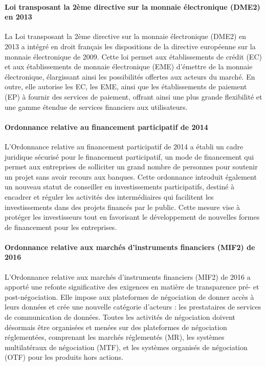 \documentclass[a4paper, 12pt]{report}
\begin{document}
\paragraph{Loi transposant la 2ème directive sur la monnaie électronique (DME2) en 2013}

La Loi transposant la 2ème directive sur la monnaie électronique (DME2) en 2013 a intégré en droit français les dispositions de la directive européenne sur la monnaie électronique de 2009. Cette loi permet aux établissements de crédit (EC) et aux établissements de monnaie électronique (EME) d’émettre de la monnaie électronique, élargissant ainsi les possibilités offertes aux acteurs du marché. En outre, elle autorise les EC, les EME, ainsi que les établissements de paiement (EP) à fournir des services de paiement, offrant ainsi une plus grande flexibilité et une gamme étendue de services financiers aux utilisateurs.

\paragraph{Ordonnance relative au financement participatif de 2014}

L'Ordonnance relative au financement participatif de 2014 a établi un cadre juridique sécurisé pour le financement participatif, un mode de financement qui permet aux entreprises de solliciter un grand nombre de personnes pour soutenir un projet sans avoir recours aux banques. Cette ordonnance introduit également un nouveau statut de conseiller en investissements participatifs, destiné à encadrer et réguler les activités des intermédiaires qui facilitent les investissements dans des projets financés par le public. Cette mesure vise à protéger les investisseurs tout en favorisant le développement de nouvelles formes de financement pour les entreprises.

\paragraph{Ordonnance relative aux marchés d’instruments financiers (MIF2) de 2016}

L'Ordonnance relative aux marchés d’instruments financiers (MIF2) de 2016 a apporté une refonte significative des exigences en matière de transparence pré- et post-négociation. Elle impose aux plateformes de négociation de donner accès à leurs données et crée une nouvelle catégorie d'acteurs : les prestataires de services de communication de données. Toutes les activités de négociation doivent désormais être organisées et menées sur des plateformes de négociation réglementées, comprenant les marchés réglementés (MR), les systèmes multilatéraux de négociation (MTF), et les systèmes organisés de négociation (OTF) pour les produits hors actions.
\end{document}
